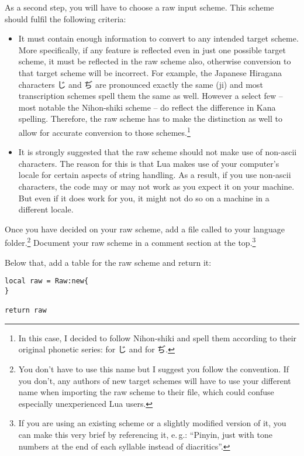 \documentclass{ltxdockit}
\begin{document}
As a second step, you will have to choose a raw input scheme. This scheme should
fulfil the following criteria:

\begin{itemize}
  \item It must contain enough information to convert to any intended target
    scheme. More specifically, if any feature is reflected even in just one
    possible target scheme, it must be reflected in the raw scheme also,
    otherwise conversion to that target scheme will be incorrect. For example,
    the Japanese Hiragana characters じ and ぢ are pronounced exactly the same
    (ji) and most transcription schemes spell them the same as well. However
    a select few -- most notable the Nihon-shiki scheme -- do reflect the
    difference in Kana spelling. Therefore, the raw scheme has to make the
    distinction as well to allow for accurate conversion to those
    schemes.\footnote{In this case, I decided to follow Nihon-shiki and spell
    them according to their original phonetic series:  for じ and
     for ぢ.}
  \item It is strongly suggested that the raw scheme should not make use of
    non-ascii characters. The reason for this is that Lua makes use of your
    computer's locale for certain aspects of string handling. As a result, if you
    use non-ascii characters, the code may or may not work as you expect it on
    your machine. But even if it does work for you, it might not do so on
    a machine in a different locale.
\end{itemize}

Once you have decided on your raw scheme, add a file called  to
your language folder.\footnote{You don't have to use this name but I suggest
you follow the convention. If you don't, any authors of new target schemes
will have to use your different name when importing the raw scheme to their
file, which could confuse especially unexperienced Lua users.} Document your raw
scheme in a comment section at the top.\footnote{If you are using an existing
scheme or a slightly modified version of it, you can make this very brief by
referencing it, e.\,g.: \enquote{Pinyin, just with tone numbers at the end of
each syllable instead of diacritics}.}

Below that, add a table for the raw scheme and return it:

\begin{lstlisting}
local raw = Raw:new{
}

return raw
\end{lstlisting}
\end{document}
